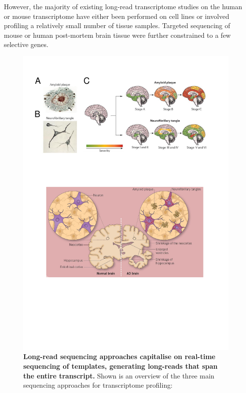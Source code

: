 However, the majority of existing long-read transcriptome studies on the human or mouse transcriptome have either been performed on cell lines or involved profiling a relatively small number of tissue samples. Targeted sequencing of mouse or human post-mortem brain tissue were further constrained to a few selective genes. 

\begin{figure}[htp]
	\centering
	\includegraphics[page=12,trim={0 9cm 0 1cm},clip, scale = 0.8]{Figures/Introduction_Figures.pdf}
	\captionsetup{width=0.95\textwidth,singlelinecheck=off}
	\caption[Addressing the limitations of short-read RNA-Seq with long-read sequencing]%
	{\textbf{Long-read sequencing approaches capitalise on real-time sequencing of templates, generating long-reads that span the entire transcript.} Shown is an overview of the three main sequencing approaches for transcriptome profiling: 		
}
\end{figure}
